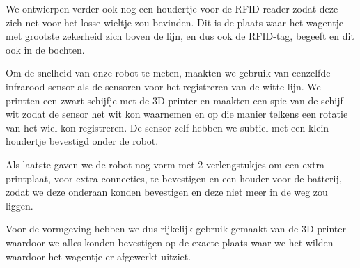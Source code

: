 We ontwierpen verder ook nog een houdertje voor de RFID-reader zodat deze zich net voor het losse wieltje zou bevinden. Dit is de plaats waar het wagentje met grootste zekerheid zich boven de lijn, en dus ook de RFID-tag, begeeft en dit ook in de bochten. 

Om de snelheid van onze robot te meten, maakten we gebruik van eenzelfde infrarood sensor als de sensoren voor het registreren van de witte lijn. We printten een zwart schijfje met de 3D-printer en maakten een spie van de schijf wit zodat de sensor het wit kon waarnemen en op die manier telkens een rotatie van het wiel kon registreren. De sensor zelf hebben we subtiel met een klein houdertje bevestigd onder de robot.

Als laatste gaven we de robot nog vorm met 2 verlengstukjes om een extra printplaat, voor extra connecties, te bevestigen en een houder voor de batterij, zodat we deze onderaan konden bevestigen en deze niet meer in de weg zou liggen.

Voor de vormgeving hebben we dus rijkelijk gebruik gemaakt van de 3D-printer waardoor we alles konden bevestigen op de exacte plaats waar we het wilden waardoor het wagentje er afgewerkt uitziet.



 

 
 
 